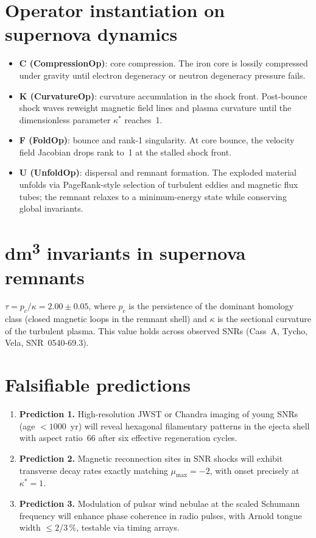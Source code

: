 \section{Operator instantiation on supernova dynamics}

\begin{itemize}
\item \textbf{C (CompressionOp)}: core compression. The iron core is lossily compressed under gravity until electron degeneracy or neutron degeneracy pressure fails.
\item \textbf{K (CurvatureOp)}: curvature accumulation in the shock front. Post-bounce shock waves reweight magnetic field lines and plasma curvature until the dimensionless parameter \(\kappa^*\) reaches~1.
\item \textbf{F (FoldOp)}: bounce and rank-1 singularity. At core bounce, the velocity field Jacobian drops rank to~1 at the stalled shock front.
\item \textbf{U (UnfoldOp)}: dispersal and remnant formation. The exploded material unfolds via PageRank-style selection of turbulent eddies and magnetic flux tubes; the remnant relaxes to a minimum-energy state while conserving global invariants.
\end{itemize}

\section{dm\textsuperscript{3} invariants in supernova remnants}

$\tau = p_c / \kappa = 2.00 \pm 0.05$, where \(p_c\) is the persistence of the dominant homology class (closed magnetic loops in the remnant shell) and \(\kappa\) is the sectional curvature of the turbulent plasma. This value holds across observed SNRs (Cass~A, Tycho, Vela, SNR~0540-69.3).

\section{Falsifiable predictions}

\begin{enumerate}
\item \textbf{Prediction 1.} High-resolution JWST or Chandra imaging of young SNRs (age $< 1000$~yr) will reveal hexagonal filamentary patterns in the ejecta shell with aspect ratio~66 after six effective regeneration cycles.
\item \textbf{Prediction 2.} Magnetic reconnection sites in SNR shocks will exhibit transverse decay rates exactly matching \(\mu_{\max} = -2\), with onset precisely at \(\kappa^* = 1\).
\item \textbf{Prediction 3.} Modulation of pulsar wind nebulae at the scaled Schumann frequency will enhance phase coherence in radio pulses, with Arnold tongue width $\le 2/3\,\%$, testable via timing arrays.
\end{enumerate}

